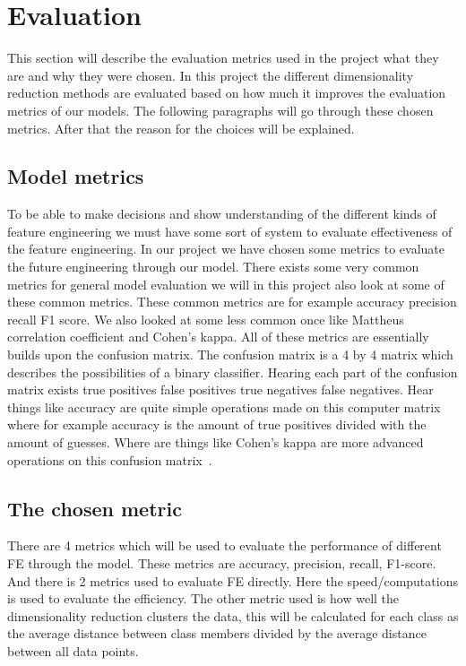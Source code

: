 \section{Evaluation}
This section will describe the evaluation metrics used in the project what they are and why they were chosen. In this project the different dimensionality reduction methods are evaluated based on how much it improves the evaluation metrics of our models.
The following paragraphs will go through these chosen metrics. After that the reason for the choices will be explained.

\subsection*{Model metrics}
To be able to make decisions and show understanding of the different kinds of feature engineering we must have some sort of system to evaluate effectiveness of the  feature engineering. In our project we have chosen some metrics to evaluate the future engineering through our model. There exists some very common metrics for general model evaluation we will in this project also look at some of these common metrics. These common metrics are for example accuracy precision recall F1 score. We also looked at some less common once like Mattheus correlation coefficient and Cohen's kappa. All of these metrics are essentially builds upon the confusion matrix. The confusion matrix is a 4 by 4 matrix which describes the possibilities of a binary classifier. Hearing each part of the confusion matrix exists true positives false positives true negatives false negatives. Hear things like accuracy are quite simple operations made on this computer matrix where for example accuracy is the amount of true positives divided with the amount of guesses. Where are things like Cohen's kappa are more advanced operations on this confusion matrix~\cite{metrics-for-multi}.

\subsection{The chosen metric}
There are 4 metrics which will be used to evaluate the performance of different FE through the model. These metrics are accuracy, precision, recall, F1-score. And there is 2 metrics used to evaluate FE directly. Here the speed/computations is used to evaluate the efficiency. The other metric used is how well the dimensionality reduction clusters the data, this will be calculated for each class as the average distance between class members divided by the average distance between all data points.

